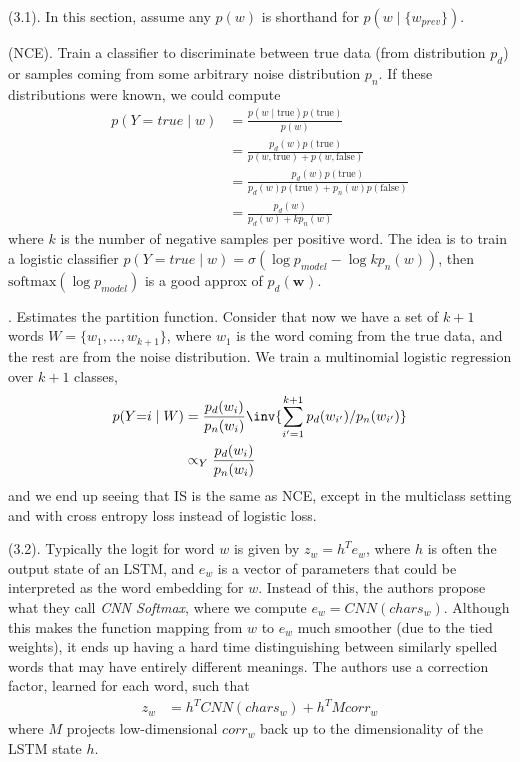 \documentclass[11pt]{article}
\renewcommand\vec[2][]{\bm{#2}_{#1}}
\newcommand\myspace[1][]{\vspace{#1\bigskipamount}}
\newcommand\p{\Needspace{10\baselineskip} \noindent}
\begin{document}
\p {} (3.1). In this section, assume any $p(w)$ is shorthand for $p(w \mid \{w_{prev}  \} )$. 
\begin{compactitem}
	\item {} (NCE). Train a classifier to discriminate between true data (from distribution $p_d$) or samples coming from some arbitrary noise distribution $p_n$. If these distributions were known, we could compute
	\begin{align}
		p(Y {=} true \mid w)
			&= \frac{ p(w \mid \text{true} ) p(\text{true}) }{ p(w)  } \\
			&= \frac{ p_d(w)  p(\text{true}) }{ p(w, \text{true}) + p(w, \text{false})  } \\
			&= \frac{ p_d(w)  p(\text{true}) }{ p_d(w)p(\text{true}) + p_n(w)p(\text{false})  } \\
			&= \frac{ p_d(w) }{ p_d(w) + k p_n(w) } 
	\end{align}
	where $k$ is the number of negative samples per positive word. The idea is to train a logistic classifier $p(Y{=}true \mid w) = \sigma(\log p_{model} - \log k p_n(w))$, then $\text{softmax}(\log p_{model})$ is a good approx of $p_d(\vec w)$. 
	
	
	\item {}. Estimates the partition function. Consider that now we have a set of $k+1$ words $W = \{w_1, \ldots, w_{k+1} \}$, where $w_1$ is the word coming from the true data, and the rest are from the noise distribution. We train a multinomial logistic regression over $k + 1$ classes,
	\begin{align}
		p(Y{=}i \mid W) 
			&= \frac{ p_d(w_i) }{  p_n(w_i)  } \inv{ \sum_{i'=1}^{k+1} p_d(w_{i'})  /   p_n(w_{i'})} \\
			&\propto_Y  \frac{ p_d(w_i) }{  p_n(w_i)  }
	\end{align} 
	and we end up seeing that IS is the same as NCE, except in the multiclass setting and with cross entropy loss instead of logistic loss. 
\end{compactitem}


\myspace
\p {} (3.2). Typically the logit for word $w$ is given by $z_w = h^T e_w$, where $h$ is often the output state of an LSTM, and $e_w$ is a vector of parameters that could be interpreted as the word embedding for $w$. Instead of this, the authors propose what they call \textit{CNN Softmax}, where we compute $e_w = CNN(chars_w)$. Although this makes the function mapping from $w$ to $e_w$ much smoother (due to the tied weights), it ends up having a hard time distinguishing between similarly spelled words that may have entirely different meanings. The authors use a correction factor, learned for each word, such that
\begin{align}
	z_w 
		&= h^T CNN(chars_w) + h^T M corr_w
\end{align}
where $M$ projects low-dimensional $corr_w$ back up to the dimensionality of the LSTM state $h$. 
\end{document}
